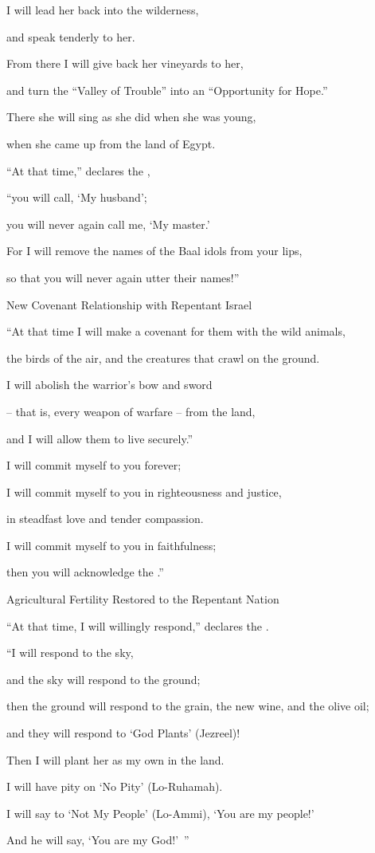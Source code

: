 {\par }{\Q I
will lead
her back
into the wilderness,
\par }{\Q and speak
tenderly to her.
\par }{\Q {}From there
I will give back
her vineyards
to her,
\par }{\Q and turn the “Valley
of Trouble”
into an “Opportunity
for Hope.”
\par }{\Q There
she will sing
as she did when
she was young,
\par }{\Q when
she came up
from the land
of Egypt.
\par }{\Q {}“At that time,”
declares
the {},
\par }{\Q “you will call, ‘My husband’;

\par }{\Q you will never
again
call
me, ‘My master.’
\par }{\Q {}For I will remove
the
names
of the Baal
idols from your lips,
\par }{\Q so that you will never
again
utter
their names!”
\par }{\SH New Covenant Relationship with Repentant Israel
\par }{\Q {}“At that time
I will make
a covenant
for them with
the wild
animals,
\par }{\Q the birds
of the air,
and the creatures that crawl
on the ground.
\par }{\Q I will abolish
the warrior’s bow
and sword
\par }{\Q – that is, every weapon of warfare – from the land,
\par }{\Q and I will allow them to live securely.”
\par }{\Q {}I will commit myself to you
forever;
\par }{\Q I will commit myself to you
in righteousness
and justice,
\par }{\Q in steadfast love
and tender compassion.
\par }{\Q {}I will commit myself to you
in faithfulness;
\par }{\Q then you will acknowledge
the {}.”
\par }{\SH Agricultural Fertility Restored to the Repentant Nation
\par }{\Q {}“At that time,
I will willingly respond,”
declares
the {}.
\par }{\Q “I will respond
to the
sky,
\par }{\Q and the sky
will respond
to the
ground;
\par }{\Q {}then the ground
will respond
to the grain,
the new wine,
and the olive oil;
\par }{\Q and they
will respond
to ‘God Plants’ (Jezreel)!
\par }{\Q {}Then I will plant
her as my own in the land.
\par }{\Q I will have pity
on ‘No
Pity’ (Lo-Ruhamah).
\par }{\Q I will say
to ‘Not
My People’
(Lo-Ammi), ‘You are my people!’
\par }{\Q And he
will say,
‘You are my God!’ ”

}

